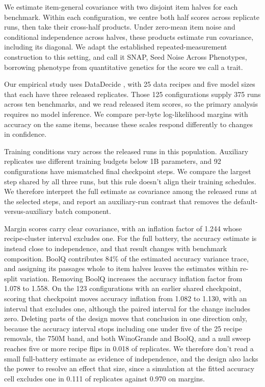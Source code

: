 \documentclass{article}
\begin{document}
We estimate item-general covariance with two disjoint item halves for each benchmark. Within each configuration, we centre both half scores across replicate runs, then take their cross-half products. Under zero-mean item noise and conditional independence across halves, these products estimate run covariance, including its diagonal. We adapt the established repeated-measurement construction to this setting, and call it SNAP, Seed Noise Across Phenotypes, borrowing phenotype from quantitative genetics for the score we call a trait.

Our empirical study uses DataDecide \citep{magnusson2025}, with 25 data recipes and five model sizes that each have three released replicates. Those 125 configurations supply 375 runs across ten benchmarks, and we read released item scores, so the primary analysis requires no model inference. We compare per-byte log-likelihood margins with accuracy on the same items, because these scales respond differently to changes in confidence.

Training conditions vary across the released runs in this population. Auxiliary replicates use different training budgets below 1B parameters, and 92 configurations have mismatched final checkpoint steps. We compare the largest step shared by all three runs, but this rule doesn't align their training schedules. We therefore interpret the full estimate as covariance among the released runs at the selected steps, and report an auxiliary-run contrast that removes the default-versus-auxiliary batch component.

Margin scores carry clear covariance, with an inflation factor of 1.244 whose recipe-cluster interval excludes one. For the full battery, the accuracy estimate is instead close to independence, and that result changes with benchmark composition. BoolQ contributes 84\% of the estimated accuracy variance trace, and assigning its passages whole to item halves leaves the estimates within re-split variation. Removing BoolQ increases the accuracy inflation factor from 1.078 to 1.558. On the 123 configurations with an earlier shared checkpoint, scoring that checkpoint moves accuracy inflation from 1.082 to 1.130, with an interval that excludes one, although the paired interval for the change includes zero. Deleting parts of the design moves that conclusion in one direction only, because the accuracy interval stops including one under five of the 25 recipe removals, the 750M band, and both WinoGrande and BoolQ, and a null sweep reaches five or more recipe flips in 0.018 of replicates. We therefore don't read a small full-battery estimate as evidence of independence, and the design also lacks the power to resolve an effect that size, since a simulation at the fitted accuracy cell excludes one in 0.111 of replicates against 0.970 on margins.
\end{document}
